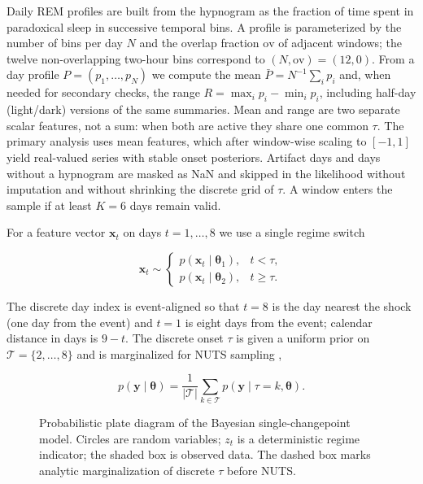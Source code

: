 Daily REM profiles are built from the hypnogram as the fraction of time spent in paradoxical sleep in successive temporal bins. A profile is parameterized by the number of bins per day \(N\) and the overlap fraction \(\mathrm{ov}\) of adjacent windows; the twelve non-overlapping two-hour bins correspond to \((N,\mathrm{ov})=(12,0)\). From a day profile \(P=(p_1,\ldots,p_N)\) we compute the mean \(\bar P=N^{-1}\sum_i p_i\) and, when needed for secondary checks, the range \(R=\max_i p_i-\min_i p_i\), including half-day (light/dark) versions of the same summaries. Mean and range are two separate scalar features, not a sum: when both are active they share one common \(\tau\). The primary analysis uses mean features, which after window-wise scaling to \([-1,1]\) yield real-valued series with stable onset posteriors. Artifact days and days without a hypnogram are masked as NaN and skipped in the likelihood without imputation and without shrinking the discrete grid of \(\tau\). A window enters the sample if at least \(K=6\) days remain valid.

For a feature vector \(\mathbf{x}_t\) on days \(t=1,\ldots,8\) we use a single regime switch

\begin{equation*}
\mathbf{x}_t \sim
\begin{cases}
p(\mathbf{x}_t\mid\boldsymbol{\theta}_1), & t < \tau,\\
p(\mathbf{x}_t\mid\boldsymbol{\theta}_2), & t \ge \tau.
\end{cases}
\end{equation*}

The discrete day index is event-aligned so that \(t=8\) is the day nearest the shock (one day from the event) and \(t=1\) is eight days from the event; calendar distance in days is \(9-t\). The discrete onset \(\tau\) is given a uniform prior on \(\mathcal{T}=\{2,\ldots,8\}\) and is marginalized for NUTS sampling \cite{HoffmanGelman2014},

\begin{equation*}
p(\mathbf{y}\mid\boldsymbol{\theta})
=
\frac{1}{|\mathcal{T}|}
\sum_{k\in\mathcal{T}}
p(\mathbf{y}\mid\tau{=}k,\boldsymbol{\theta}).
\end{equation*}


\begin{figure}[t]
  \centering
  \resizebox{0.78\textwidth}{!}{}
  \caption{Probabilistic plate diagram of the Bayesian single-changepoint model.
  Circles are random variables; $z_t$ is a deterministic regime indicator; the shaded box is observed data.
  The dashed box marks analytic marginalization of discrete $\tau$ before NUTS.}
  \label{fig:tau-model}
\end{figure}


